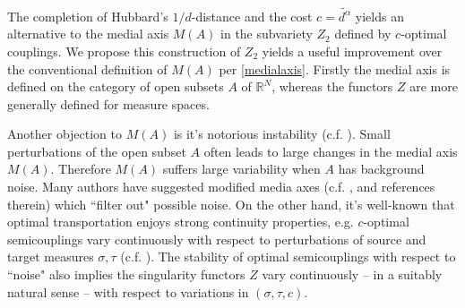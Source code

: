 \documentclass[12pt]{article}
\theoremstyle{definition}
\theoremstyle{remark}
\newcommand{\bR}{\mathbb{R}}
\begin{document}
The completion of Hubbard's $1/d$-distance and the cost $c=\tilde{d^\alpha}$ yields an alternative to the medial axis $M(A)$ in the subvariety $Z_2$ defined by $c$-optimal couplings. We propose this construction of $Z_2$ yields a useful improvement over the conventional definition of $M(A)$ per \eqref{medialaxis}. Firstly the medial axis is defined on the category of open subsets $A$ of $\bR^N$, whereas the functors $Z$ are more generally defined for measure spaces. 

Another objection to $M(A)$ is it's notorious instability (c.f. \cite[\S 1]{Sun}). Small perturbations of the open subset $A$ often leads to large changes in the medial axis $M(A)$. Therefore $M(A)$ suffers large variability when $A$ has background noise. Many authors have suggested modified media axes (c.f. \cite{Foskey}, \cite{Tam} and references therein) which ``filter out" possible noise. On the other hand, it's well-known that optimal transportation enjoys strong continuity properties, e.g. $c$-optimal semicouplings vary continuously with respect to perturbations of source and target measures $\sigma, \tau$ (c.f. \cite[Ch. 28]{Vil1}). The stability of optimal semicouplings with respect to ``noise" also implies the singularity functors $Z$ vary continuously -- in a suitably natural sense -- with respect to variations in $(\sigma, \tau, c)$. 




















\printbibliography[title={References}]
\end{document}
